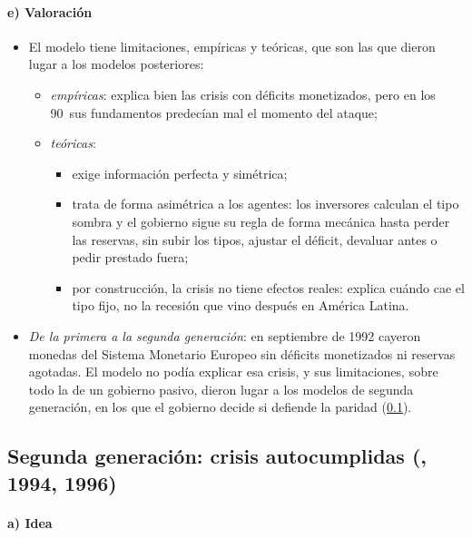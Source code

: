 \documentclass[11pt]{article}
\begin{document}
\paragraph{e) Valoración}

\begin{itemize}
\item El modelo tiene limitaciones, empíricas y teóricas, que son las que dieron lugar a los modelos posteriores:
  \begin{itemize}
  \item \emph{empíricas}: explica bien las crisis con déficits monetizados, pero en los 90~sus fundamentos predecían mal el momento del ataque;
  \item \emph{teóricas}:
    \begin{itemize}
    \item exige información perfecta y simétrica;
    \item trata de forma asimétrica a los agentes: los inversores calculan el tipo sombra y el gobierno sigue su regla de forma mecánica hasta perder las reservas, sin subir los tipos, ajustar el déficit, devaluar antes o pedir prestado fuera;
    \item por construcción, la crisis no tiene efectos reales: explica cuándo cae el tipo fijo, no la recesión que vino después en América Latina.
    \end{itemize}
  \end{itemize}
\item \emph{De la primera a la segunda generación}: en septiembre de 1992 cayeron monedas del Sistema Monetario Europeo sin déficits monetizados ni reservas agotadas. El modelo no podía explicar esa crisis, y sus limitaciones, sobre todo la de un gobierno pasivo, dieron lugar a los modelos de segunda generación, en los que el gobierno decide si defiende la paridad (\ref{sec:segunda}).
\end{itemize}

\subsection{Segunda generación: crisis autocumplidas\cortetitulo{} (, 1994, 1996)}\label{sec:segunda}

\paragraph{a) Idea}
\end{document}
